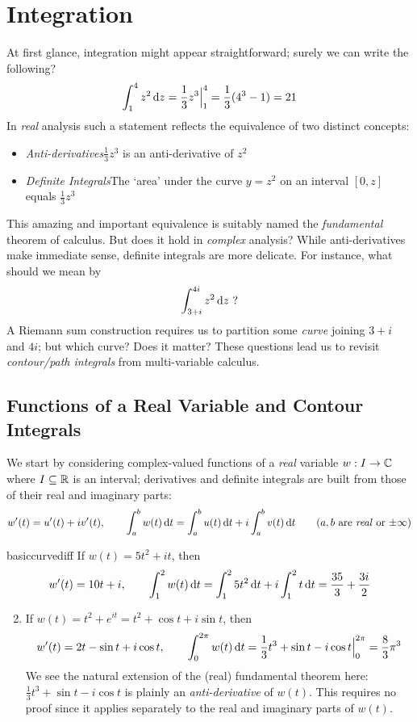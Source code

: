 \graphicspath{{4integrals/asy/}}


\section{Integration}

At first glance, integration might appear straightforward; surely we can write the following?
\[
	\int_1^4 z^2\,{\mathrm{d} z}=\frac 13z^3\Big|_1^4 =\frac 13(4^3-1) =21
\]
In \emph{real} analysis such a statement reflects the equivalence of two distinct concepts:
\begin{itemize}\itemsep0pt
	\item[]\emph{Anti-derivatives}\quad $\frac 13z^3$ is an anti-derivative of $z^2$
	\item[]\emph{Definite Integrals}\quad The `area' under the curve $y=z^2$ on an interval $[0,z]$ equals $\frac 13z^3$
\end{itemize}
This amazing and important equivalence is suitably named the \emph{fundamental} theorem of calculus. But does it hold in \emph{complex} analysis? While anti-derivatives make immediate sense, definite integrals are more delicate. For instance, what should we mean by
\[
	\int_{3+i}^{4i} z^2\,{\mathrm{d} z}\text{ ?}
\]
A Riemann sum construction requires us to partition some \emph{curve} joining $3+i$ and $4i$; but which curve? Does it matter? These questions lead us to revisit \emph{contour/path integrals} from multi-variable calculus.

\subsection[Contour Integrals]{Functions of a Real Variable and Contour Integrals}\label{sec:contour}

We start by considering complex-valued functions of a \emph{real} variable $w:I\to\mathbb{C}$ where $I\subseteq\mathbb{R}$ is an interval; derivatives and definite integrals are built from those of their real and imaginary parts:
\[
	w'(t)=u'(t)+iv'(t),\qquad
	\int_a^bw(t)\,\dt=\int_a^bu(t)\,\dt+i\int_a^bv(t)\,\dt
	\tag{$a,b$ are \emph{real} or $\pm\infty$}
\]

\begin{examples}{}{basiccurvediff}
	\exstart If $w(t)=5t^2+it$, then
	\[
		w'(t)=10t+i,\qquad 
		\int_1^2w(t)\,{\mathrm{d} t}
		=\int_1^25t^2\,{\mathrm{d} t}+i\int_1^2t\,{\mathrm{d} t} 
		=\frac{35}3+\frac{3i}2
	\]
	\begin{enumerate}\setcounter{enumi}{1}
		\item If $w(t)=t^2+e^{it}=t^2+\cos t+i\sin t$, then
		\[
			w'(t)=2t-\sin t+i\cos t,\qquad \int_0^{2\pi}w(t)\,{\mathrm{d} t}=\frac 13t^3+\sin t-i\cos t\Big|_0^{2\pi}=\frac 83\pi^3
		\]
		We see the natural extension of the (real) fundamental theorem here: $\frac 13t^3+\sin t-i\cos t$ is plainly an \emph{anti-derivative} of $w(t)$. This requires no proof since it applies separately to the real and imaginary parts of $w(t)$.
	\end{enumerate}
\end{examples}

